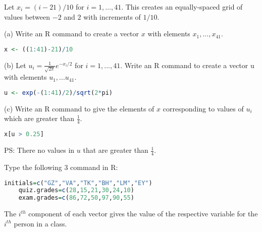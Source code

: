 \documentclass[boxes, qed]{homework}
\begin{document}
\newenvironment{amatrix}[1]{%
  \left[\begin{array}{@{}*{#1}{c}|c@{}}
}{%
  \end{array}\right]
}

\newenvironment{augmatrix}[1]{%
  \left[\begin{array}{#1}
}{%
  \end{array}\right]
}

\begin{problem}Let $x_i=(i - 21)/10$ for $i = 1,\dots, 41$.
  This creates an equally-spaced grid of values between
  $-2$ and $2$ with increments of $1/10$.
\end{problem}
\begin{solution}
  (a) Write an R command to create a vector $x$ with 
  elements $x_1, . . . , x_{41}$.
  \begin{lstlisting}[backgroundcolor = \color{lightgray},language = R]
    x <- ((1:41)-21)/10
  \end{lstlisting}

  (b) Let $u_i = \frac{1}{\sqrt{2\pi}}e^{-x_i/2}$
  for $i = 1, . . . , 41$. Write an R command to create a vector u with elements
  $u_1, . . . u_{41}$.
  \begin{lstlisting}[backgroundcolor = \color{lightgray},language = R]
    u <- exp(-(1:41)/2)/sqrt(2*pi)
  \end{lstlisting}

  (c) Write an R command to give the elements of $x$
  corresponding to values of $u_i$ which are greater
  than $\frac{1}{4}$.
  \begin{lstlisting}[backgroundcolor = \color{lightgray},language = R]
    x[u > 0.25]
  \end{lstlisting}
  PS: There no values in $u$ that are greater than $\frac{1}{4}$.
\end{solution}
\begin{problem} Type the following 3 command in R:
  \begin{lstlisting}[backgroundcolor = \color{lightgray},language = R]
    initials=c("GZ","VA","TK","BH","LM","EY")
    quiz.grades=c(28,15,21,30,24,10)
    exam.grades=c(86,72,50,97,90,55)
  \end{lstlisting}
  The $i^{th}$ component of each vector gives the value of the respective 
  variable for the $i^{th}$ person in a class.
\end{problem}
\end{document}
